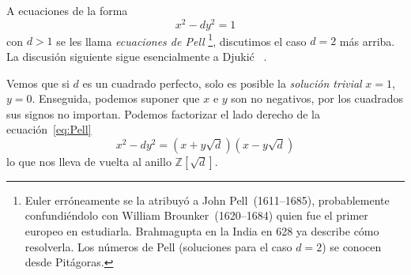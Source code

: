   A ecuaciones de la forma
  \begin{equation}
    \label{eq:Pell}
    x^2 - d y^2
      = 1
  \end{equation}
  con \(d > 1\) se les llama \emph{ecuaciones de Pell}%
    \footnote{Euler%
	      erróneamente se la atribuyó
	      a John Pell~(1611--1685),%
	      probablemente confundiéndolo con
	      William Brounker~(1620--1684)%
	      quien fue el primer europeo en estudiarla.
	      Brahmagupta%
	      en la India en 628 ya describe cómo resolverla.
	      Los números de Pell%
	      (soluciones para el caso \(d = 2\))
	      se conocen desde Pitágoras.%
		},%
  discutimos el caso \(d = 2\) más arriba.
  La discusión siguiente sigue esencialmente a Djukić~%
      \cite{djukic07:_Pell_equation}.

  Vemos que si \(d\) es un cuadrado perfecto,
  solo es posible la \emph{solución trivial} \(x = 1\), \(y = 0\).
  Enseguida,
  podemos suponer que \(x\) e \(y\) son no negativos,
  por los cuadrados sus signos no importan.
  Podemos factorizar el lado derecho de la ecuación~\eqref{eq:Pell}
  \begin{equation*}
    x^2 - d y^2
      = (x + y \sqrt{d}) (x - y \sqrt{d})
  \end{equation*}
  lo que nos lleva de vuelta al anillo \(\mathbb{Z}[\sqrt{d}]\).%

